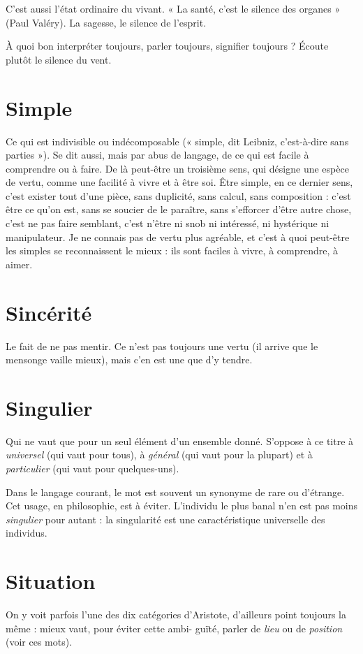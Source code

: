 C'est aussi l’état ordinaire du vivant. « La santé, c’est le silence des
organes » (Paul Valéry). La sagesse, le silence de l'esprit.

À quoi bon interpréter toujours, parler toujours, signifier toujours ? Écoute
plutôt le silence du vent.

\section{Simple}
Ce qui est indivisible ou indécomposable (« simple, dit Leibniz,
c'est-à-dire sans parties »). Se dit aussi, mais par abus de langage, de
ce qui est facile à comprendre ou à faire. De là peut-être un troisième sens, qui
désigne une espèce de vertu, comme une facilité à vivre et à être soi. Être
simple, en ce dernier sens, c’est exister tout d’une pièce, sans duplicité, sans
calcul, sans composition : c’est être ce qu’on est, sans se soucier de le paraître,
sans s’efforcer d’être autre chose, c’est ne pas faire semblant, c’est n’être ni snob
ni intéressé, ni hystérique ni manipulateur. Je ne connais pas de vertu plus
agréable, et c’est à quoi peut-être les simples se reconnaissent le mieux : ils sont
faciles à vivre, à comprendre, à aimer.

\section{Sincérité}
Le fait de ne pas mentir. Ce n’est pas toujours une vertu (il
arrive que le mensonge vaille mieux), mais c’en est une que d’y
tendre.

\section{Singulier}
Qui ne vaut que pour un seul élément d’un ensemble donné.
S’oppose à ce titre à {\it universel} (qui vaut pour tous), à {\it général}
(qui vaut pour la plupart) et à {\it particulier} (qui vaut pour quelques-uns).

Dans le langage courant, le mot est souvent un synonyme de rare ou
d’étrange. Cet usage, en philosophie, est à éviter. L’individu le plus banal n’en
est pas moins {\it singulier} pour autant : la singularité est une caractéristique universelle
des individus.

\section{Situation}
On y voit parfois l’une des dix catégories d’Aristote, d’ailleurs
point toujours la même : mieux vaut, pour éviter cette ambi-
guïté, parler de {\it lieu} ou de {\it position} (voir ces mots).

